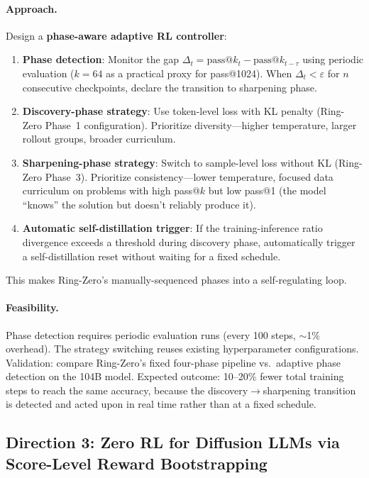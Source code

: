 \documentclass[11pt,a4paper]{article}
\begin{document}
\paragraph{Approach.} Design a \textbf{phase-aware adaptive RL controller}:
\begin{enumerate}
\item \textbf{Phase detection}: Monitor the gap $\Delta_t = \mathrm{pass@}k_t - \mathrm{pass@}k_{t-\tau}$ using periodic evaluation ($k = 64$ as a practical proxy for pass@1024). When $\Delta_t < \varepsilon$ for $n$ consecutive checkpoints, declare the transition to sharpening phase.
\item \textbf{Discovery-phase strategy}: Use token-level loss with KL penalty (Ring-Zero Phase~1 configuration). Prioritize diversity---higher temperature, larger rollout groups, broader curriculum.
\item \textbf{Sharpening-phase strategy}: Switch to sample-level loss without KL (Ring-Zero Phase~3). Prioritize consistency---lower temperature, focused data curriculum on problems with high pass@$k$ but low pass@1 (the model ``knows'' the solution but doesn't reliably produce it).
\item \textbf{Automatic self-distillation trigger}: If the training-inference ratio divergence exceeds a threshold during discovery phase, automatically trigger a self-distillation reset without waiting for a fixed schedule.
\end{enumerate}
This makes Ring-Zero's manually-sequenced phases into a self-regulating loop.

\paragraph{Feasibility.} Phase detection requires periodic evaluation runs (every 100 steps, ${\sim}$1\% overhead). The strategy switching reuses existing hyperparameter configurations. Validation: compare Ring-Zero's fixed four-phase pipeline vs.\ adaptive phase detection on the 104B model. Expected outcome: 10--20\% fewer total training steps to reach the same accuracy, because the discovery$\to$sharpening transition is detected and acted upon in real time rather than at a fixed schedule.

\subsection{Direction 3: Zero RL for Diffusion LLMs via Score-Level Reward Bootstrapping}
\end{document}
